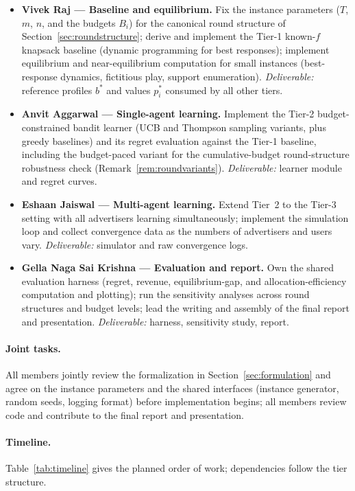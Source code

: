 \documentclass{article}
\theoremstyle{definition}
\theoremstyle{remark}
\begin{document}
\begin{itemize}[leftmargin=*]
  \item \textbf{Vivek Raj --- Baseline and equilibrium.} Fix the instance parameters ($T$, $m$, $n$, and the budgets $B_i$) for the canonical round structure of Section~\ref{sec:roundstructure}; derive and implement the Tier-1 known-$f$ knapsack baseline (dynamic programming for best responses); implement equilibrium and near-equilibrium computation for small instances (best-response dynamics, fictitious play, support enumeration). \emph{Deliverable:} reference profiles $b^\ast$ and values $p_i^\ast$ consumed by all other tiers.
  \item \textbf{Anvit Aggarwal --- Single-agent learning.} Implement the Tier-2 budget-constrained bandit learner (UCB and Thompson sampling variants, plus greedy baselines) and its regret evaluation against the Tier-1 baseline, including the budget-paced variant for the cumulative-budget round-structure robustness check (Remark~\ref{rem:roundvariants}). \emph{Deliverable:} learner module and regret curves.
  \item \textbf{Eshaan Jaiswal --- Multi-agent learning.} Extend Tier~2 to the Tier-3 setting with all advertisers learning simultaneously; implement the simulation loop and collect convergence data as the numbers of advertisers and users vary. \emph{Deliverable:} simulator and raw convergence logs.
  \item \textbf{Gella Naga Sai Krishna --- Evaluation and report.} Own the shared evaluation harness (regret, revenue, equilibrium-gap, and allocation-efficiency computation and plotting); run the sensitivity analyses across round structures and budget levels; lead the writing and assembly of the final report and presentation. \emph{Deliverable:} harness, sensitivity study, report.
\end{itemize}

\paragraph{Joint tasks.} All members jointly review the formalization in Section~\ref{sec:formulation} and agree on the instance parameters and the shared interfaces (instance generator, random seeds, logging format) before implementation begins; all members review code and contribute to the final report and presentation.

\paragraph{Timeline.} Table~\ref{tab:timeline} gives the planned order of work; dependencies follow the tier structure.
\end{document}
